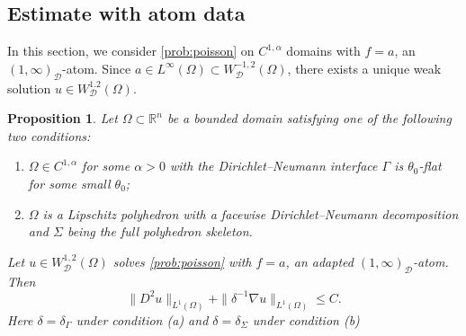 \documentclass[12pt]{amsart}
\newtheorem{proposition}[theorem]{Proposition}
\numberwithin{equation}{section}
\newcommand{\bR}{\mathbb{R}}
\newcommand\cD{\mathcal{D}}
\begin{document}
\subsection{Estimate with atom data}

In this section, we consider \eqref{prob:poisson} on $C^{1,\alpha}$ domains with $f=a$, an $(1,\infty)_\cD$-atom. Since $a \in L^\infty(\Omega) \subset W^{-1,2}_{\cD}(\Omega)$, there exists a unique weak solution $u \in W^{1.2}_\cD(\Omega)$.

\begin{proposition}
 \label{prop:atom-data}
 Let $\Omega\subset\bR^n$ be a bounded domain satisfying one of the following two conditions:
 \begin{enumerate}
    \item $\Omega \in C^{1,\alpha}$ for some $\alpha > 0$ with the Dirichlet--Neumann interface $\Gamma$ is $\theta_0$-flat for some small $\theta_0$;
    \item $\Omega$ is a Lipschitz polyhedron with a facewise Dirichlet--Neumann decomposition and $\Sigma$ being the full polyhedron skeleton.
\end{enumerate}
Let $u\in W_{\cD}^{1,2}(\Omega)$ solves \eqref{prob:poisson} with $f=a$, an adapted $(1,\infty)_{\cD}$-atom. Then
 \begin{equation}
  \|D^2u\|_{L^1(\Omega)}
  +\|\delta^{-1}\nabla u\|_{L^1(\Omega)}
  \leq C.
  \label{eq:atom-data-estimate}
 \end{equation}
 Here $\delta = \delta_\Gamma$ under condition (a) and $\delta = \delta_\Sigma$ under condition (b)
\end{proposition}
\end{document}
